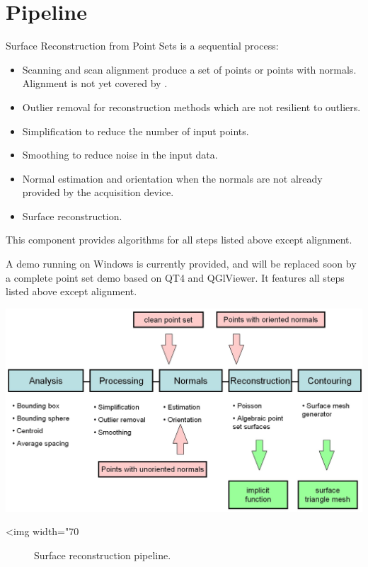 \section{Pipeline}

Surface Reconstruction from Point Sets is a sequential process:

\begin{itemize}
\item Scanning and scan alignment produce a set of points
      or points with normals. Alignment is not yet
      covered by \cgal.
\item Outlier removal for reconstruction methods which
      are not resilient to outliers.
\item Simplification to reduce the number of input points.
\item Smoothing to reduce noise in the input data.
\item Normal estimation and orientation when the normals
      are not already provided by the acquisition device.
\item Surface reconstruction.
\end{itemize}

This component provides algorithms for all steps listed above except alignment. 

A demo running on Windows is currently provided,
and will be replaced soon by a complete point set demo based on QT4 and QGlViewer.
It features all steps listed above except alignment.

\begin{center}
    \label{Point_set_processing_3-fig-pipeline}
    \begin{ccTexOnly}
        \includegraphics[width=1.0\textwidth]{Point_set_processing_3/pipeline} %
    \end{ccTexOnly}
    \begin{ccHtmlOnly}
        <img width="70%
    \end{ccHtmlOnly}
    \begin{figure}[h]
        \caption{Surface reconstruction pipeline.}
    \end{figure}
\end{center}


